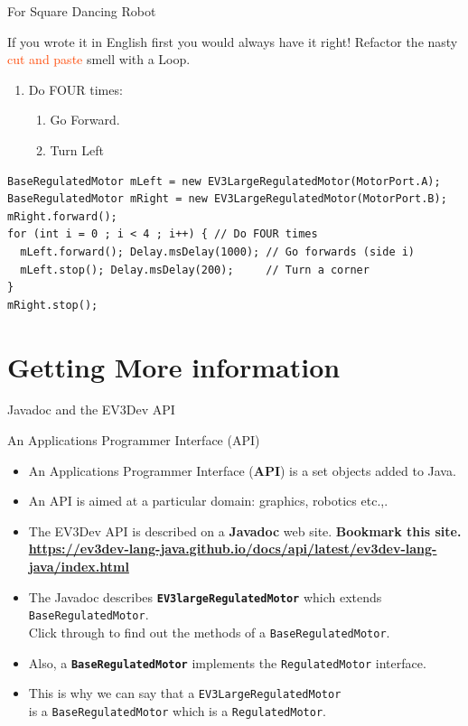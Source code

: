 \documentclass[color=pdftex,usenames,dvipsnames, aspectratio=169]{beamer}
\begin{document}
\begin{frame}[fragile]{For Square Dancing Robot}
\begin{block}{If you wrote it in English first you would always have it right!}
Refactor the nasty \textcolor{OrangeRed}{cut and paste} smell with a Loop.
\begin{enumerate}
 \item Do FOUR times:
\begin{enumerate}
 \item Go Forward.
 \item Turn Left
\end{enumerate}
\end{enumerate}
\end{block}

\begin{lstlisting}[xrightmargin=0.1in,basicstyle=\ttfamily\footnotesize\color{blue},emph={for}]
BaseRegulatedMotor mLeft = new EV3LargeRegulatedMotor(MotorPort.A);
BaseRegulatedMotor mRight = new EV3LargeRegulatedMotor(MotorPort.B);
mRight.forward();
for (int i = 0 ; i < 4 ; i++) { // Do FOUR times
  mLeft.forward(); Delay.msDelay(1000); // Go forwards (side i)
  mLeft.stop(); Delay.msDelay(200);     // Turn a corner
}
mRight.stop();
\end{lstlisting}
\end{frame}

\section{Getting More information}
\begin{frame}[fragile]{Javadoc and the EV3Dev API}
\begin{block}{An Applications Programmer Interface (API)}
\begin{itemize}
\item An Applications Programmer Interface (\alert{\textbf{API}}) is a set objects added to Java.
\item An API is aimed at a particular domain: graphics, robotics etc.,.  
\item The EV3Dev API is described on a \alert{\textbf{Javadoc}} web site.
\textbf{Bookmark this site. \url{https://ev3dev-lang-java.github.io/docs/api/latest/ev3dev-lang-java/index.html}} 
\item The Javadoc describes \textbf{\lstinline!EV3largeRegulatedMotor!} which extends \lstinline!BaseRegulatedMotor!.\\
Click through to find out the methods of a \lstinline!BaseRegulatedMotor!.
\item Also, a \textbf{\lstinline!BaseRegulatedMotor!} implements the \lstinline!RegulatedMotor! interface.
\item This is why we can say that a \lstinline!EV3LargeRegulatedMotor!\\
 is a \lstinline!BaseRegulatedMotor! which
  is a \lstinline!RegulatedMotor!.
\end{itemize}
\end{block}
\end{frame}
\end{document}
